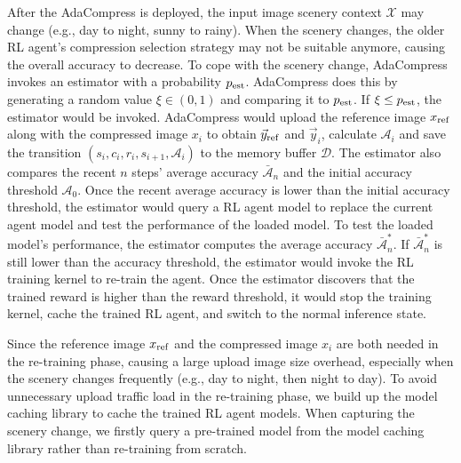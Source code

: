 After the AdaCompress is deployed, the input image scenery context $ \mathcal{X} $ may change (e.g., day to night, sunny to rainy). When the scenery changes, the older RL agent's compression selection strategy may not be suitable anymore, causing the overall accuracy to decrease. To cope with the scenery change, AdaCompress invokes an estimator with a probability $ p_{\rm est} $. AdaCompress does this by generating a random value $ \xi \in (0,1) $ and comparing it to $ p_{\rm est} $. If $ \xi \leq p_{\rm est} $, the estimator would be invoked. AdaCompress would upload the reference image $ x_{\rm ref} $ along with the compressed image $ x_i $ to obtain $ \vec{y}_{\rm ref} $ and $ \vec{y}_i $, calculate $ \mathcal{A}_i $ and save the transition {\color{revise2}$ (s_i, c_i, r_i, s_{i+1},\mathcal{A}_i ) $} to the memory buffer $ \mathcal{D} $. The estimator also compares the recent $ n $ steps' average accuracy $ \bar{\mathcal{A}}_n $ and the initial accuracy threshold $ \mathcal{A}_0 $. Once the recent average accuracy is lower than the initial accuracy threshold, the estimator would query a RL agent model to replace the current agent model and test the performance of the loaded model. To test the loaded model's performance, the estimator computes the average accuracy $ \bar{\mathcal{A}}^*_n $. If $ \bar{\mathcal{A}}^*_n $ is still lower than the accuracy threshold, the estimator would invoke the RL training kernel to re-train the agent. Once the estimator discovers that the trained reward is higher than the reward threshold, it would stop the training kernel, cache the trained RL agent, and switch to the normal inference state. 

Since the reference image $ x_{\rm ref} $ and the compressed image $ x_i $ are both needed in the re-training phase, causing a large upload image size overhead, especially when the scenery changes frequently (e.g., day to night, then night to day). To avoid unnecessary upload traffic load in the re-training phase, we build up the model caching library to cache the trained RL agent models. When capturing the scenery change, we firstly query a pre-trained model from the model caching library rather than re-training from scratch. %

